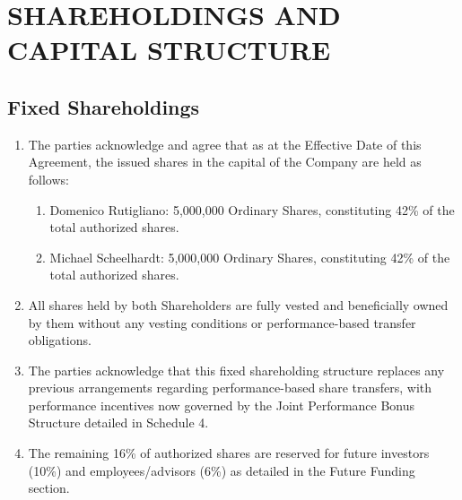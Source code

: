 \section{SHAREHOLDINGS AND CAPITAL STRUCTURE}

\subsection{Fixed Shareholdings}
\begin{enumerate}[label=(\alph*)]
\item The parties acknowledge and agree that as at the Effective Date of this Agreement, the issued shares in the capital of the Company are held as follows:
    \begin{enumerate}[label=(\roman*)]
    \item Domenico Rutigliano: 5,000,000 Ordinary Shares, constituting 42\% of the total authorized shares.
    \item Michael Scheelhardt: 5,000,000 Ordinary Shares, constituting 42\% of the total authorized shares.
    \end{enumerate}
\item All shares held by both Shareholders are fully vested and beneficially owned by them without any vesting conditions or performance-based transfer obligations.
\item The parties acknowledge that this fixed shareholding structure replaces any previous arrangements regarding performance-based share transfers, with performance incentives now governed by the Joint Performance Bonus Structure detailed in Schedule 4.
\item The remaining 16\% of authorized shares are reserved for future investors (10\%) and employees/advisors (6\%) as detailed in the Future Funding section.
\end{enumerate}

